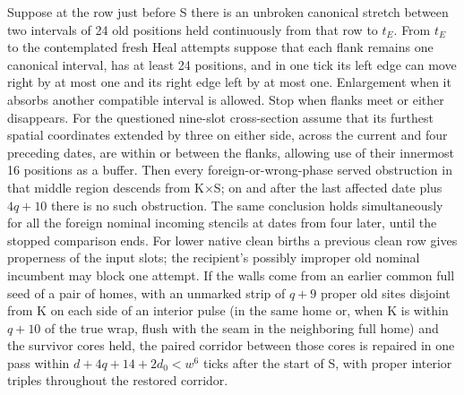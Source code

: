 \begin{lemma}\label{lem:flanks}
Suppose at the row just before S there is an unbroken canonical stretch between two intervals of 24 old positions held continuously from that row to \(t_E\). From \(t_E\) to the contemplated fresh Heal attempts suppose that each flank remains one canonical interval, has at least 24 positions, and in one tick its left edge can move right by at most one and its right edge left by at most one. Enlargement when it absorbs another compatible interval is allowed. Stop when flanks meet or either disappears. For the questioned nine-slot cross-section assume that its furthest spatial coordinates extended by three on either side, across the current and four preceding dates, are within or between the flanks, allowing use of their innermost 16 positions as a buffer. Then every foreign-or-wrong-phase served obstruction in that middle region descends from K\(\times\)S; on and after the last affected date plus \(4q+10\) there is no such obstruction. The same conclusion holds simultaneously for all the foreign nominal incoming stencils at dates from four later, until the stopped comparison ends. For lower native clean births a previous clean row gives properness of the input slots; the recipient's possibly improper old nominal incumbent may block one attempt. If the walls come from an earlier common full seed of a pair of homes, with an unmarked strip of \(q+9\) proper old sites disjoint from K on each side of an interior pulse (in the same home or, when K is within \(q+10\) of the true wrap, flush with the seam in the neighboring full home) and the survivor cores held, the paired corridor between those cores is repaired in one pass within \(d+4q+14+2d_0<w^6\) ticks after the start of S, with proper interior triples throughout the restored corridor.
\end{lemma}
